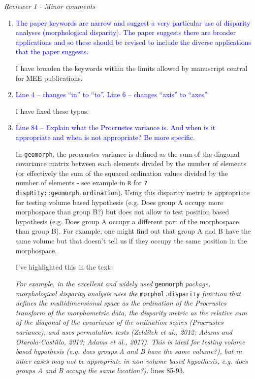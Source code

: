 \documentclass[12pt,letterpaper]{article}
\renewcommand{\subsection}[1]{%
\bigskip
\begin{center}
\begin{large}
\normalfont\itshape #1
\end{large}
\end{center}}
\begin{document}
\subsection{Reviewer 1 - Minor comments}

\begin{enumerate}

\item{\textcolor{blue}{The paper keywords are narrow and suggest a very particular use of disparity analyses (morphological disparity). The paper suggests there are broader applications and so these should be revised to include the diverse applications that the paper suggests. }}

I have broaden the keywords within the limits allowed by manuscript central for MEE publications. 

\item{\textcolor{blue}{Line 4 – changes ``in'' to ``to''. Line 6 – changes ``axis'' to ``axes''}}
\label{abstract_typo}

I have fixed these typos.

\item{\textcolor{blue}{Line 84 – Explain what the Procrustes variance is. And when is it appropriate and when is not appropriate? Be more specific.}}
\label{tone_down}

In \texttt{geomorph}, the procrustes variance is defined as the sum of the diagonal covariance matrix between each elements divided by the number of elements (or effectively the sum of the squared ordination values divided by the number of elements - see example in \texttt{R} for \texttt{?dispRity::geomorph.ordination}).
Using this disparity metric is appropriate for testing volume based hypothesis (e.g. Does group A occupy more morphospace than group B?) but does not allow to test position based hypothesis (e.g. Does group A occupy a different part of the morphospace than group B).
For example, one might find out that group A and B have the same volume but that doesn't tell us if they occupy the same position in the morphospace.

I've highlighted this in the text:

\textit{For example, in the excellent and widely used} \texttt{geomorph} \textit{package, morphological disparity analysis uses the} \texttt{morphol.disparity} \textit{function that defines the multidimensional space as the ordination of the Procrustes transform of the morphometric data, the disparity metric as the relative sum of the diagonal of the covariance of the ordination scores (Procrustes variance), and uses permutation tests (Zelditch et al., 2012; Adams and Otarola-Castillo, 2013; Adams et al., 2017). This is ideal for testing volume based hypothesis (e.g. does groups A and B have the same volume?), but in other cases may not be appropriate in non-volume based hypothesis, e.g. does groups A and B occupy the same location?).} lines 85-93.


\end{enumerate}
\end{document}
